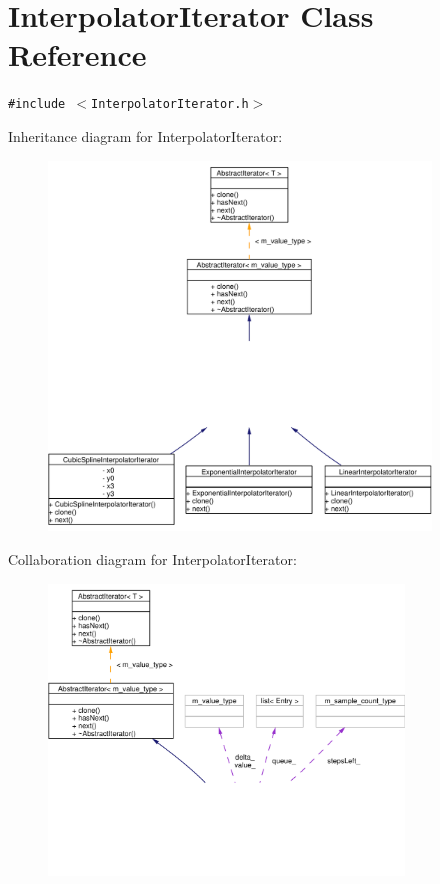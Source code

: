 \hypertarget{classInterpolatorIterator}{
\section{Interpolator\-Iterator Class Reference}
\label{classInterpolatorIterator}
}
{\tt \#include $<$Interpolator\-Iterator.h$>$}

Inheritance diagram for Interpolator\-Iterator:\begin{figure}[H]
\begin{center}
\leavevmode
\includegraphics[width=288pt]{classInterpolatorIterator__inherit__graph}
\end{center}
\end{figure}
Collaboration diagram for Interpolator\-Iterator:\begin{figure}[H]
\begin{center}
\leavevmode
\includegraphics[width=268pt]{classInterpolatorIterator__coll__graph}
\end{center}
\end{figure}
